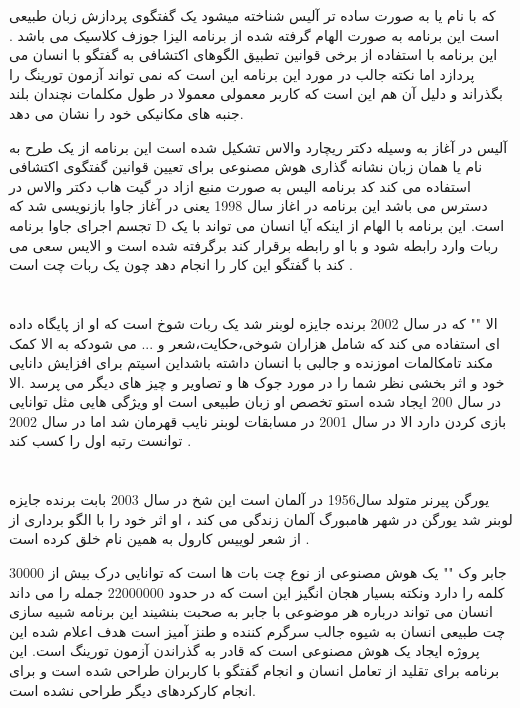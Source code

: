 \documentclass[18pt,a4paper]{report}
\begin{document}
 که با نام  یا به صورت ساده تر آلیس شناخته میشود یک گفتگوی پردازش زبان طبیعی است این برنامه به صورت الهام گرفته شده از برنامه الیزا جوزف کلاسیک می باشد .
این برنامه با استفاده از برخی قوانین تطبیق الگوهای اکتشافی به گفتگو با انسان می پردازد اما نکته جالب در مورد این برنامه این است که نمی تواند آزمون تورینگ را بگذراند و دلیل آن هم این است که کاربر معمولی معمولا در طول مکلمات نچندان بلند جنبه های مکانیکی خود را نشان می دهد.

آلیس در آغاز به وسیله دکتر ریچارد والاس تشکیل شده است این برنامه از یک طرح   به نام    یا همان زبان نشانه گذاری هوش مصنوعی برای تعیین قوانین گفتگوی اکتشافی استفاده می کند کد برنامه الیس به صورت منبع ازاد در گیت هاب دکتر والاس در دسترس می باشد این برنامه در اغاز سال 1998 یعنی در آغاز جاوا بازنویسی شد که تجسم اجرای جاوا برنامه D  است. این برنامه با الهام از اینکه آیا انسان می تواند با یک ربات وارد رابطه شود و با او رابطه برقرار کند برگرفته شده است و الایس سعی می کند با گفتگو این کار را انجام دهد چون یک ربات چت است .

\section{}
الا "" که در سال 2002 برنده جایزه لوبنر شد یک ربات شوخ است که او از پایگاه داده ای استفاده می کند که شامل هزاران شوخی،حکایت،شعر و ... می شودکه به الا کمک مکند تامکالمات اموزنده و جالبی با انسان داشته باشداین اسیتم برای افزایش دانایی خود و اثر بخشی نظر شما را در مورد جوک ها و تصاویر و چیز های دیگر می پرسد .الا در سال 200 ایجاد شده استو تخصص او زبان طبیعی است او ویژگی هایی مثل توانایی بازی کردن دارد الا در سال 2001 در مسابقات لوبنر نایب قهرمان شد اما در سال 2002 توانست رتبه اول را کسب کند .

\section{}
یورگن پیرنر متولد سال1956 در آلمان است این شخ در سال 2003 بابت   برنده جایزه لوبنر شد یورگن در شهر هامبورگ آلمان زندگی می کند ، او اثر خود را با الگو برداری از  از شعر لوییس کارول به همین نام خلق کرده است .

جابر وک "" یک هوش مصنوعی از نوع چت بات ها است که توانایی درک بیش از 30000 کلمه را دارد ونکته بسیار هجان انگیز این است که در حدود 22000000 جمله را می داند انسان می تواند درباره هر موضوعی با جابر به صحبت بنشیند 
این برنامه شبیه سازی چت طبیعی انسان به شیوه جالب سرگرم کننده و طنز آمیز است هدف اعلام شده این پروژه ایجاد یک هوش مصنوعی است که قادر به گذراندن آزمون تورینگ است. این برنامه برای تقلید از تعامل انسان و انجام گفتگو با کاربران طراحی شده است و برای انجام کارکردهای دیگر طراحی نشده است.
\end{document}
